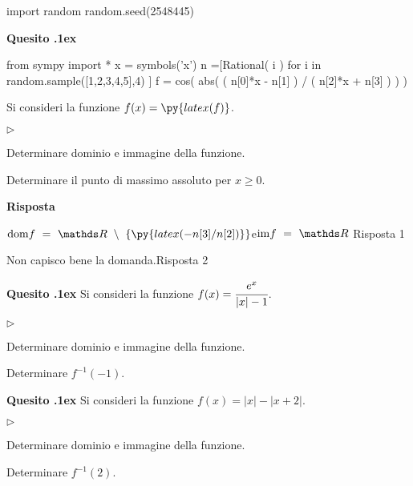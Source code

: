 \documentclass[11pt,twoside,a4paper]{article}
\newcommand{\mylabel}[1]{#1\hfill}
\renewenvironment{itemize}
  {\begin{list}{$\triangleright$}{%
   \setlength{\parskip}{0mm}
   \setlength{\topsep}{.4\baselineskip}
   \setlength{\rightmargin}{0mm}
   \setlength{\listparindent}{0mm}
   \setlength{\itemindent}{0mm}
   \setlength{\labelwidth}{2ex}
   \setlength{\itemsep}{.4\baselineskip}
   \setlength{\parsep}{0mm}
   \setlength{\partopsep}{0mm}
   \setlength{\labelsep}{1ex}
   \setlength{\leftmargin}{\labelwidth+\labelsep}
   \let\makelabel\mylabel}}{%
   \end{list}\vspace*{-1.3mm}}
\newcounter{quesito}
\newenvironment{question}{\bigskip\addtocounter{quesito}{1}\bigskip\bigskip\par\textbf{Quesito \thequesito.\kern1ex}}{\vspace{\parskip}}
\newenvironment{answer}{\par\textbf{Risposta\quad}}{\vspace{\parskip}}
\begin{document}
\begin{pycode}
import random
random.seed(2548445)
\end{pycode}

\begin{question}
\def\RR{{\mathds R}}
\def\dom{{\rm dom}}
\def\range{{\rm im}}
\begin{pycode}
from sympy import *
x = symbols('x')
n =[Rational( i ) for i in random.sample([1,2,3,4,5],4) ]
f = cos( abs( ( n[0]*x - n[1] ) / ( n[2]*x + n[3] ) ) )
\end{pycode}
Si consideri la funzione $\displaystyle f(x) = \py{latex(f)}$.
\begin{itemize}
\item[1.] Determinare dominio e immagine della funzione.
\item[2.] Determinare il punto di massimo assoluto per $x \geq 0$.
\end{itemize}
\begin{answer}

\smallskip
{\color{blue}$\displaystyle \dom f \ =\ \RR\ \setminus\ \left\{\py{latex(-n[3]/n[2])}\right\} $\quad e\quad $\range f \ =\ \RR$ \hfill Risposta 1}

{\color{blue}Non capisco bene la domanda.\hfill Risposta 2}

\end{answer}
\end{question}

\begin{question}
Si consideri la funzione $\displaystyle f(x) = \cfrac{e^x}{\lvert x \rvert - 1}$.
\begin{itemize}
\item[1.] Determinare dominio e immagine della funzione.
\item[2.] Determinare $f^{-1}(-1)$.
\end{itemize}
\end{question}

\begin{question}
Si consideri la funzione $\displaystyle f(x) = \lvert x \rvert - \lvert x + 2 \rvert$.
\begin{itemize}
\item[1.] Determinare dominio e immagine della funzione.
\item[2.] Determinare $f^{-1}(2)$.
\end{itemize}
\end{question}
\end{document}
